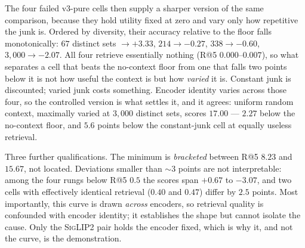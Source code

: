 The four failed v3-pure cells then supply a sharper version of the same comparison, because they
hold utility fixed at zero and vary only how repetitive the junk is. Ordered by diversity, their
accuracy relative to the floor falls monotonically: $67$ distinct sets $\to +3.33$, $214 \to
-0.27$, $338 \to -0.60$, $3{,}000 \to -2.07$. All four retrieve essentially nothing
(R@5 $0.000$--$0.007$), so what separates a cell that beats the no-context floor from one that
falls two points below it is not how useful the context is but how \emph{varied} it is. Constant
junk is discounted; varied junk costs something. Encoder identity varies across those four, so the
controlled version is what settles it, and it agrees: uniform random context, maximally varied at
$3{,}000$ distinct sets, scores $17.00$ --- $2.27$ below the no-context floor, and $5.6$ points
below the constant-junk cell at equally useless retrieval.

Three further qualifications. The minimum is \emph{bracketed} between R@5 $8.23$ and $15.67$, not
located. Deviations smaller than ${\sim}3$ points are not interpretable: among the four rungs
below R@5 $0.5$ the scores span $+0.67$ to $-3.07$, and two cells with effectively identical
retrieval ($0.40$ and $0.47$) differ by $2.5$ points. Most importantly, this curve is drawn
\emph{across} encoders, so retrieval quality is confounded with encoder identity; it establishes
the shape but cannot isolate the cause. Only the \textsc{SigLIP2} pair holds the encoder fixed,
which is why it, and not the curve, is the demonstration.

